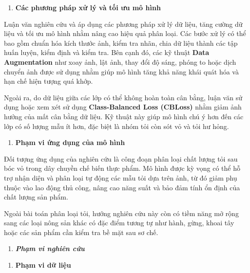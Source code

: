 \documentclass[
]{article}
\begin{document}
\begin{enumerate}
\def\labelenumi{\alph{enumi}.}
\setcounter{enumi}{3}
\item
  \textbf{Các phương pháp xử lý và tối ưu mô hình}
\end{enumerate}

Luận văn nghiên cứu và áp dụng các phương pháp xử lý dữ liệu, tăng cường
dữ liệu và tối ưu mô hình nhằm nâng cao hiệu quả phân loại. Các bước xử
lý có thể bao gồm chuẩn hóa kích thước ảnh, kiểm tra nhãn, chia dữ liệu
thành các tập huấn luyện, kiểm định và kiểm tra. Bên cạnh đó, các kỹ
thuật \textbf{Data Augmentation} như xoay ảnh, lật ảnh, thay đổi độ
sáng, phóng to hoặc dịch chuyển ảnh được sử dụng nhằm giúp mô hình tăng
khả năng khái quát hóa và hạn chế hiện tượng quá khớp.

Ngoài ra, do dữ liệu giữa các lớp có thể không hoàn toàn cân bằng, luận
văn sử dụng hoặc xem xét sử dụng \textbf{Class-Balanced Loss (CBLoss)}
nhằm giảm ảnh hưởng của mất cân bằng dữ liệu. Kỹ thuật này giúp mô hình
chú ý hơn đến các lớp có số lượng mẫu ít hơn, đặc biệt là nhóm tỏi còn
sót vỏ và tỏi hư hỏng.

\begin{enumerate}
\def\labelenumi{\alph{enumi}.}
\setcounter{enumi}{4}
\item
  \textbf{Phạm vi ứng dụng của mô hình}
\end{enumerate}

Đối tượng ứng dụng của nghiên cứu là công đoạn phân loại chất lượng tỏi
sau bóc vỏ trong dây chuyền chế biến thực phẩm. Mô hình được kỳ vọng có
thể hỗ trợ nhận diện và phân loại tự động các mẫu tỏi dựa trên ảnh, từ
đó giảm phụ thuộc vào lao động thủ công, nâng cao năng suất và bảo đảm
tính ổn định của chất lượng sản phẩm.

Ngoài bài toán phân loại tỏi, hướng nghiên cứu này còn có tiềm năng mở
rộng sang các loại nông sản khác có đặc điểm tương tự như hành, gừng,
khoai tây hoặc các sản phẩm cần kiểm tra bề mặt sau sơ chế.

\begin{enumerate}
\def\labelenumi{\arabic{enumi}.}
\item
  \protect{}\label{_Toc232111986}{}\emph{\textbf{Phạm vi
  nghiên cứu}}
\end{enumerate}

\begin{enumerate}
\def\labelenumi{\alph{enumi}.}
\item
  \textbf{Phạm vi dữ liệu}
\end{enumerate}
\end{document}
